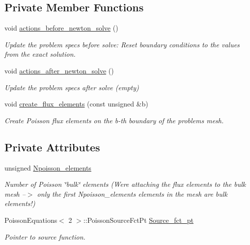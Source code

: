 \subsection*{Private Member Functions}
\begin{DoxyCompactItemize}
\item 
void \hyperlink{classFluxPoissonProblem_aaea8f7f6f7a2e1aedfd2854e1ae12338}{actions\+\_\+before\+\_\+newton\+\_\+solve} ()
\begin{DoxyCompactList}\small\item\em Update the problem specs before solve\+: Reset boundary conditions to the values from the exact solution. \end{DoxyCompactList}\item 
void \hyperlink{classFluxPoissonProblem_aa52ae9abbe805520a697929ab115f114}{actions\+\_\+after\+\_\+newton\+\_\+solve} ()
\begin{DoxyCompactList}\small\item\em Update the problem specs after solve (empty) \end{DoxyCompactList}\item 
void \hyperlink{classFluxPoissonProblem_a542ce9cc1c4e17eae68d51d2e13ac0c3}{create\+\_\+flux\+\_\+elements} (const unsigned \&b)
\begin{DoxyCompactList}\small\item\em Create Poisson flux elements on the b-\/th boundary of the problem\textquotesingle{}s mesh. \end{DoxyCompactList}\end{DoxyCompactItemize}
\subsection*{Private Attributes}
\begin{DoxyCompactItemize}
\item 
unsigned \hyperlink{classFluxPoissonProblem_a1ee0cfcbc307252430a3a5ba7ab7fd6e}{Npoisson\+\_\+elements}
\begin{DoxyCompactList}\small\item\em Number of Poisson \char`\"{}bulk\char`\"{} elements (We\textquotesingle{}re attaching the flux elements to the bulk mesh --$>$ only the first Npoisson\+\_\+elements elements in the mesh are bulk elements!) \end{DoxyCompactList}\item 
Poisson\+Equations$<$ 2 $>$\+::Poisson\+Source\+Fct\+Pt \hyperlink{classFluxPoissonProblem_ad003b34801b1c58b762bec0fe00b86aa}{Source\+\_\+fct\+\_\+pt}
\begin{DoxyCompactList}\small\item\em Pointer to source function. \end{DoxyCompactList}\end{DoxyCompactItemize}


